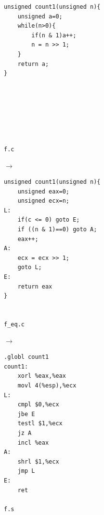 \begin{minipage}{0.3\textwidth}
    \begin{verbatim}
unsigned count1(unsigned n){
    unsigned a=0;
    while(n>0){
        if(n & 1)a++;
        n = n >> 1;
    }
    return a;
}







f.c
    \end{verbatim}
\end{minipage}
\hfill
$\longrightarrow$
\hfill
\begin{minipage}{0.3\textwidth}
    \begin{verbatim}
unsigned count1(unsigned n){
    unsigned eax=0;
    unsigned ecx=n;
L:
    if(c <= 0) goto E;
    if ((n & 1)==0) goto A;
    eax++;
A:
    ecx = ecx >> 1;
    goto L;
E:  
    return eax
}


f_eq.c
    \end{verbatim}
\end{minipage}
\hfill
$\longrightarrow$
\hfill
\begin{minipage}{0.3\textwidth}
    \begin{verbatim}
.globl count1
count1:
    xorl %eax,%eax
    movl 4(%esp),%ecx
L:
    cmpl $0,%ecx
    jbe E
    testl $1,%ecx
    jz A
    incl %eax
A:
    shrl $1,%ecx
    jmp L
E:
    ret

f.s
    \end{verbatim} 
\end{minipage}\medskip\\
